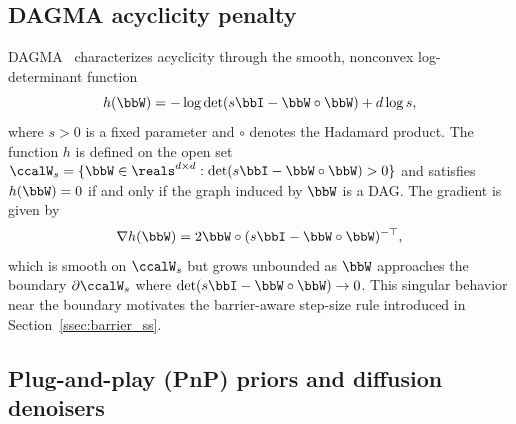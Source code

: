 \documentclass[conference]{IEEEtran}
\newcommand{\nz}[1]{{\color{red}{[Nicolas: #1]}}}
\begin{document}
	\subsection{DAGMA acyclicity penalty}
	
	DAGMA~\cite{bello2022dagma} characterizes acyclicity through the smooth, nonconvex log-determinant function
	\begin{equation}\label{eq:dagma}
		h(\bbW) = -\log \det(s\bbI - \bbW \circ \bbW) + d \log s,
	\end{equation}
	where $s > 0$ is a fixed parameter and $\circ$ denotes the Hadamard product. The function $h$ is defined on the open set $\ccalW_s = \{ \bbW \in \reals^{d \times d} : \det(s\bbI - \bbW \circ \bbW) > 0 \}$ and satisfies $h(\bbW) = 0$ if and only if the graph induced by $\bbW$ is a DAG. The gradient is given by
	\begin{equation}\label{eq:dagma_grad}
		\nabla h(\bbW) = 2\bbW\circ(s\bbI - \bbW \circ \bbW)^{-\top},
	\end{equation}
	which is smooth on $\ccalW_s$ but grows unbounded as $\bbW$ approaches the boundary $\partial \ccalW_s$ where $\det(s\bbI - \bbW \circ \bbW) \to 0$. This singular behavior near the boundary motivates the barrier-aware step-size rule introduced in Section~\ref{ssec:barrier_ss}.
	
	\subsection{Plug-and-play (PnP) priors and diffusion denoisers}
	\label{ssec:back_pnp}
\end{document}
